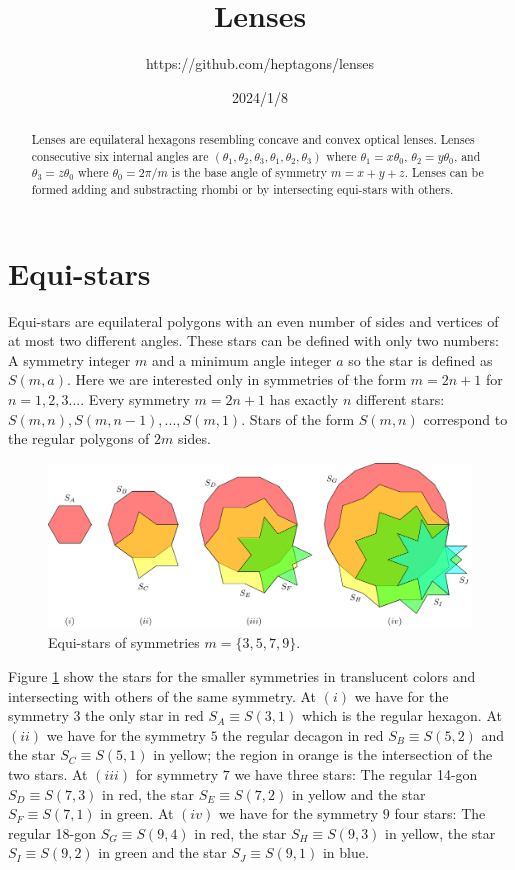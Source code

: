 \documentclass[11pt]{article}
\title{Lenses}
\author{https://github.com/heptagons/lenses}
\date{2024/1/8}
\begin{document}
\maketitle
\begin{abstract}
Lenses are equilateral hexagons resembling concave and convex optical lenses. Lenses consecutive six internal angles are $(\theta_1,\theta_2,\theta_3,\theta_1,\theta_2,\theta_3)$ where $\theta_1 = x\theta_0$, $\theta_2 = y\theta_0$, and $\theta_3 = z\theta_0$ where $\theta_0 = 2\pi/m$ is the base angle of symmetry $m = x + y + z$. Lenses can be formed adding and substracting rhombi or by intersecting equi-stars with others.
\end{abstract}

\section{Equi-stars}

Equi-stars are equilateral polygons with an even number of sides and vertices of at most two different angles. These stars can be defined with only two numbers: A symmetry integer $m$ and a minimum angle integer $a$ so the star is defined as $S(m,a)$. Here we are interested only in symmetries of the form $m=2n+1$ for $n=1,2,3...$. Every symmetry $m=2n+1$ has exactly $n$ different stars: $S(m,n),S(m,n-1),...,S(m,1)$. Stars of the form $S(m,n)$ correspond to the regular polygons of $2m$ sides.

\begin{figure}[H]
\centering
\includegraphics[scale=1]{stars/stars}
\caption{Equi-stars of symmetries $m=\{3,5,7,9\}$.}
\label{fig:stars}
\end{figure}

Figure \ref{fig:stars} show the stars for the smaller symmetries in translucent colors and intersecting with others of the same symmetry. At $(i)$ we have for the symmetry $3$ the only star in red $S_A \equiv S(3,1)$ which is the regular hexagon. At $(ii)$ we have for the symmetry $5$ the regular decagon in red $S_B \equiv S(5,2)$ and the star $S_C \equiv S(5,1)$ in yellow; the region in orange is the intersection of the two stars. At $(iii)$ for symmetry $7$ we have three stars: The regular 14-gon $S_D \equiv S(7,3)$ in red, the star $S_E \equiv S(7,2)$ in yellow and the star $S_F \equiv S(7,1)$ in green. At $(iv)$ we have for the symmetry $9$ four stars: The regular 18-gon $S_G \equiv S(9,4)$ in red, the star $S_H \equiv S(9,3)$ in yellow, the star $S_I \equiv S(9,2)$ in green and the star $S_J \equiv S(9,1)$ in blue.
\end{document}
